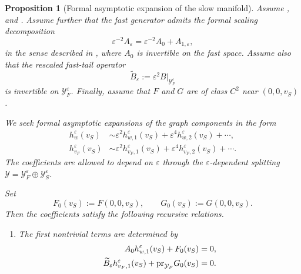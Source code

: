 \documentclass[11pt]{article}
\newtheorem{proposition}[theorem]{Proposition}
\theoremstyle{definition}
\theoremstyle{remark}
\numberwithin{equation}{section}
\newcommand{\mc}[1]{\mathcal{#1}}
\newcommand{\pr}{\textnormal{pr}}
\begin{document}
\begin{proposition}[Formal asymptotic expansion of the slow manifold]
\label{prop: asymptotic exp}
Assume ,  and .
Assume further that the fast generator admits the formal scaling
decomposition
\[
\varepsilon^{-2}A_\varepsilon
=
\varepsilon^{-2}A_0+ A_{1,\varepsilon},
\]
in the sense described in , where
\(A_0\) is invertible on the fast space. Assume also that the rescaled
fast-tail operator
\[
\widetilde B_\varepsilon
:=
\varepsilon^2B|_{\mathcal Y_F^\varepsilon}
\]
is invertible on \(\mathcal Y_F^\varepsilon\). Finally, assume that \(F\)
and \(G\) are of class \(C^2\) near \((0,0,v_S)\).

We seek formal asymptotic expansions of the graph components in the form
\begin{align}
h_w^\varepsilon(v_S)
&\sim
\varepsilon^2h_{w,1}^\varepsilon(v_S)
+
\varepsilon^4h_{w,2}^\varepsilon(v_S)
+\cdots,
\\
h_{v_F}^\varepsilon(v_S)
&\sim
\varepsilon^2h_{v_F,1}^\varepsilon(v_S)
+
\varepsilon^4h_{v_F,2}^\varepsilon(v_S)
+\cdots .
\end{align}
The coefficients are allowed to depend on \(\varepsilon\) through the
\(\varepsilon\)-dependent splitting
\(\mc Y=\mc Y_F^\varepsilon\oplus\mc Y_S^\varepsilon\).

Set
\[
F_0(v_S):=F(0,0,v_S),
\qquad
G_0(v_S):=G(0,0,v_S).
\]
Then the coefficients satisfy the following recursive relations.

\begin{enumerate}[label=\textup{(\roman*)},leftmargin=2.5em]

\item The first nontrivial terms are determined by
\begin{align}
\label{eq:first-order-hw-corrected}
A_0h_{w,1}^\varepsilon(v_S)+F_0(v_S)&=0,
\\
\label{eq:first-order-hF-corrected}
\widetilde B_\varepsilon h_{v_F,1}^\varepsilon(v_S)
+
\pr_{\mc Y_F}G_0(v_S)&=0.
\end{align}


\end{enumerate}
\end{proposition}
\end{document}
